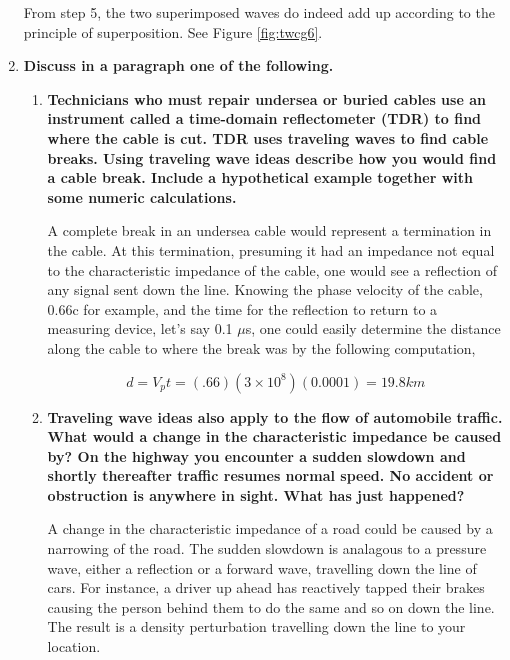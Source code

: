 \begin{enumerate}[resume]
From step 5, the two superimposed waves do indeed add up according to the principle of superposition. See Figure \ref{fig:twcg6}.

\item {\bf Discuss in a paragraph one of the following.}

\begin{enumerate}[label=\Alph*)]

\item {\bf Technicians who must repair undersea or buried cables use an instrument called a {\bf time-domain reflectometer} (TDR) to find where the cable is cut. TDR uses traveling waves to find cable breaks. Using traveling wave ideas describe how you would find a cable break. Include a hypothetical example together with some numeric calculations.}\newline

A complete break in an undersea cable would represent a termination in the cable. At this termination, presuming it had an impedance not equal to the characteristic impedance of the cable, one would see a reflection of any signal sent down the line. Knowing the phase velocity of the cable, 0.66c for example, and the time for the reflection to return to a measuring device, let's say 0.1 $\mu$s, one could easily determine the distance along the cable to where the break was by the following computation,

\begin{equation}
d=V_pt=\left(.66\right)\left(3\times10^{8}\right)\left(0.0001\right)=19.8 km
\label{}
\end{equation}

\item {\bf Traveling wave ideas also apply to the flow of automobile traffic. What would a change in the characteristic impedance be caused by? On the highway you encounter a sudden slowdown and shortly thereafter traffic resumes normal speed. No accident or obstruction is anywhere in sight. What has just happened?}\newline

A change in the characteristic impedance of a road could be caused by a narrowing of the road. The sudden slowdown is analagous to a pressure wave, either a reflection or a forward wave, travelling down the line of cars. For instance, a driver up ahead has reactively tapped their brakes causing the person behind them to do the same and so on down the line. The result is a density perturbation travelling down the line to your location.


\end{enumerate}
\end{enumerate}
